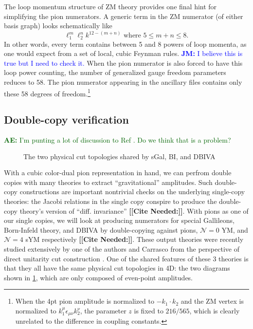 \documentclass[11pt,letter]{article}
\newcommand{\ace}[1]{\textcolor{darkgreen}{\textbf{AE:}{ #1}}}
\newcommand{\jm}[1]{\textcolor{blue}{\textbf{JM: }{#1}}}
\def\be{\begin{equation}}
\def\ee{\end{equation}}
\newcommand{\citepls}[1]{{\bf\color{red}[[Cite Needed:#1]]}}
\begin{document}
The loop momentum structure of ZM theory provides one final hint for simplifying the pion numerators.
A generic term in the ZM numerator (of either basis graph) looks schematically like
\be
\ell_1^m \ell_2^n k^{12-(m+n)} \text{ where } 5 \leq m+n \leq 8.
\ee
In other words, every term contains between 5 and 8 powers of loop momenta, as one would expect from a set of local, cubic Feynman rules.
\jm{I believe this is true but I need to check it.}
When the pion numerator is also forced to have this loop power counting, the number of generalized gauge freedom parameters reduces to 58.
The pion numerator appearing in the ancillary files contains only these 58 degrees of freedom.\footnote{When the 4pt pion amplitude is normalized to $-k_1\cdot k_2$ and the ZM vertex is normalized to $k_1^\mu \epsilon_{\mu\nu}k_2^\nu$, the parameter $z$ is fixed to $216/565$, which is clearly unrelated to the difference in coupling constants.}

\subsection{Double-copy verification}
\ace{I'm punting a lot of discussion to Ref \cite{Carrasco:2023qgz}.
  Do we think that is a problem?}

\begin{figure}
  \begin{center}
	\PhysicalCutOne{}{}{}{} \PhysicalCutTwo{}{}{}{}
  \end{center}
  \caption{The two physical cut topologies shared by sGal, BI, and DBIVA}
  \label{fig:emu}
\end{figure}

With a cubic color-dual pion representation in hand, we can perfrom
double copies with many theories to extract ``gravitational''
amplitudes.  Such double-copy constructions are important nontrivial
checks on the underlying single-copy theories: the Jacobi relations in
the single copy conspire to produce the double-copy theory's version
of ``diff. invariance'' \citepls{}.  With pions as one of our single
copies, we will look at producing numerators for special Gallileons,
Born-Infeld theory, and DBIVA by double-copying against pions,
$\mathcal{N}=0$ YM, and $\mathcal{N}=4$ sYM respectively \citepls{}.
These output theories were recently studied extensively by one of the
authors and Carrasco from the perspective of direct unitarity cut
construction \cite{Carrasco:2023qgz}.  One of the shared features of
these 3 theories is that they all have the same physical cut
topologies in 4D: the two diagrams shown in \cref{fig:emu}, which are
only composed of even-point amplitudes.
\end{document}
